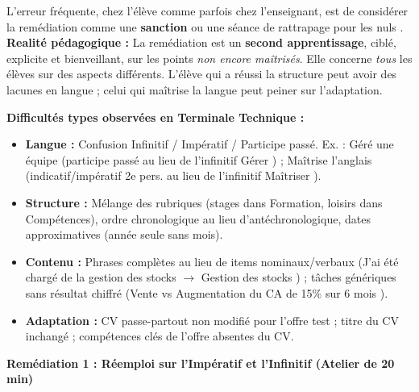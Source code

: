 \documentclass[11pt]{article}
\begin{document}
\begin{attention}
L'erreur fréquente, chez l'élève comme parfois chez l'enseignant, est de considérer la remédiation comme une \textbf{sanction} ou une \guillemotleft séance de rattrapage pour les nuls \guillemotright.
\textbf{Realité pédagogique :} La remédiation est un \textbf{second apprentissage}, ciblé, explicite et bienveillant, sur les points \emph{non encore maîtrisés}. Elle concerne \emph{tous} les élèves sur des aspects différents. L'élève qui a réussi la structure peut avoir des lacunes en langue ; celui qui maîtrise la langue peut peiner sur l'adaptation.
\end{attention}

\textbf{Difficultés types observées en Terminale Technique :}
\begin{itemize}
    \item \textbf{Langue :} Confusion Infinitif / Impératif / Participe passé. Ex. : \guillemotleft *Géré une équipe \guillemotright (participe passé au lieu de l'infinitif \guillemotleft Gérer \guillemotright) ; \guillemotleft *Maîtrise l'anglais \guillemotright (indicatif/impératif 2e pers. au lieu de l'infinitif \guillemotleft Maîtriser \guillemotright).
    \item \textbf{Structure :} Mélange des rubriques (stages dans Formation, loisirs dans Compétences), ordre chronologique au lieu d'antéchronologique, dates approximatives (année seule sans mois).
    \item \textbf{Contenu :} Phrases complètes au lieu de items nominaux/verbaux (\guillemotleft J'ai été chargé de la gestion des stocks \guillemotright $\rightarrow$ \guillemotleft Gestion des stocks \guillemotright) ; tâches génériques sans résultat chiffré (\guillemotleft Vente \guillemotright vs \guillemotleft Augmentation du CA de 15\% sur 6 mois \guillemotright).
    \item \textbf{Adaptation :} CV \guillemotleft passe-partout \guillemotright non modifié pour l'offre test ; titre du CV inchangé ; compétences clés de l'offre absentes du CV.
\end{itemize}

\textbf{Remédiation 1 : Réemploi sur l'Impératif et l'Infinitif (Atelier de 20 min)}
\end{document}
